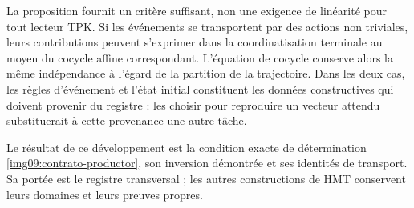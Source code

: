 La proposition fournit un critère suffisant, non une exigence de
linéarité pour tout lecteur TPK. Si les événements se transportent par des actions
non triviales, leurs contributions peuvent s’exprimer dans la coordinatisation terminale
au moyen du cocycle affine correspondant. L’équation de cocycle conserve
alors la même indépendance à l’égard de la partition de la trajectoire.
Dans les deux cas, les règles d’événement et l’état initial constituent les
données constructives qui doivent provenir du registre : les choisir pour
reproduire un vecteur attendu substituerait à cette provenance une autre tâche.

Le résultat de ce développement est la condition exacte de détermination
\eqref{img09:contrato-productor}, son inversion démontrée et ses identités
de transport. Sa portée est le registre transversal ; les autres
constructions de HMT conservent leurs domaines et leurs preuves propres.
